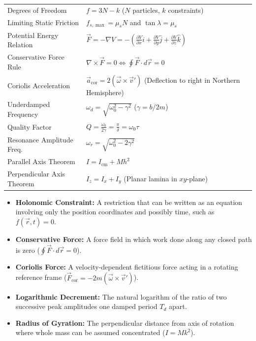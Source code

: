 \documentclass[12pt,a4paper]{article}
\renewcommand{\arraystretch}{1.45}
\begin{document}
\begin{tcolorbox}[formulabox, title={\textbf{Key Formulas and Metrics at a Glance}}]
\renewcommand{\arraystretch}{1.35}
\begin{tabularx}{\linewidth}{B{5.0cm} X}
Degrees of Freedom & $f = 3N - k$ \quad ($N$ particles, $k$ constraints) \\[4pt]
Limiting Static Friction & $f_{s,\max} = \mu_s N$ \quad and \quad $\tan\lambda = \mu_s$ \\[4pt]
Potential Energy Relation & $\vec{F} = -\nabla V = -\left(\frac{\partial V}{\partial x}\hat{i} + \frac{\partial V}{\partial y}\hat{j} + \frac{\partial V}{\partial z}\hat{k}\right)$ \\[4pt]
Conservative Force Rule & $\nabla \times \vec{F} = 0 \iff \oint \vec{F} \cdot d\vec{r} = 0$ \\[4pt]
Coriolis Acceleration & $\vec{a}_{\text{cor}} = 2(\vec{\omega} \times \vec{v}')$ \quad (Deflection to right in Northern Hemisphere) \\[4pt]
Underdamped Frequency & $\omega_d = \sqrt{\omega_0^2 - \gamma^2}$ \quad ($\gamma = b/2m$) \\[4pt]
Quality Factor & $Q = \frac{\omega_0}{2\gamma} = \frac{\pi}{\delta} = \omega_0 \tau$ \\[4pt]
Resonance Amplitude Freq. & $\omega_r = \sqrt{\omega_0^2 - 2\gamma^2}$ \\[4pt]
Parallel Axis Theorem & $I = I_{\text{cm}} + M h^2$ \\[4pt]
Perpendicular Axis Theorem & $I_z = I_x + I_y$ \quad (Planar lamina in $xy$-plane) \\[4pt]
\end{tabularx}
\end{tcolorbox}

\begin{tcolorbox}[defbox, title={\textbf{One-Line Definitions}}]
\begin{itemize}[leftmargin=*, itemsep=2pt]
  \item \textbf{Holonomic Constraint:} A restriction that can be written as an equation involving only the position coordinates and possibly time, such as $f(\vec{r},t)=0$.
  \item \textbf{Conservative Force:} A force field in which work done along any closed path is zero ($\oint \vec{F} \cdot d\vec{r} = 0$).
  \item \textbf{Coriolis Force:} A velocity-dependent fictitious force acting in a rotating reference frame ($\vec{F}_{\text{cor}} = -2m(\vec{\omega} \times \vec{v}')$).
  \item \textbf{Logarithmic Decrement:} The natural logarithm of the ratio of two successive peak amplitudes one damped period $T_d$ apart.
  \item \textbf{Radius of Gyration:} The perpendicular distance from axis of rotation where whole mass can be assumed concentrated ($I = M k^2$).
\end{itemize}
\end{tcolorbox}
\end{document}
